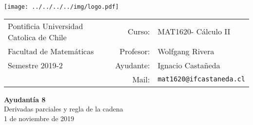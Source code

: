 \documentclass[12pt]{article}
\makeatletter
\newcommand{\ayudantia}{{\sc Ayudantía 8}}
\newcommand{\tituloayu}{Derivadas parciales y regla de la cadena}
\newcommand{\fecha}{1 de noviembre de 2019}
\newcommand{\sigla}{MAT1620}
\newcommand{\nombre}{Cálculo II}
\newcommand{\profesor}{Wolfgang Rivera}
\newcommand{\ano}{2019}
\newcommand{\semestre}{2}
\newcommand{\mail}{mat1620@ifcastaneda.cl}
\makeatother
\begin{document}
\thispagestyle{empty}

\begin{minipage}{2cm}
	\texttt{[image: ../../../../img/logo.pdf]}
	\vspace{0.5cm}
\end{minipage}
\begin{minipage}{\linewidth}
	\begin{tabular}{lrl}
		{\scriptsize\sc Pontificia Universidad Catolica de Chile} & \hspace*{0.7in}Curso: &
		\sigla  - \nombre\\
		{\sc Facultad de Matemáticas}&
		Profesor: & \profesor \\
		{\sc Semestre \ano-\semestre} & Ayudante: & {Ignacio Castañeda}\\
		& {Mail:} & \texttt{\mail}
	\end{tabular}
\end{minipage}

\vspace{-10mm}
\begin{center}
	{\LARGE\bf \ayudantia}\\
	\vspace{0.1cm}
	{\tituloayu}\\
	\vspace{0.1cm}
	\fecha\\
	\vspace{0.4cm}
\end{center}
\end{document}
